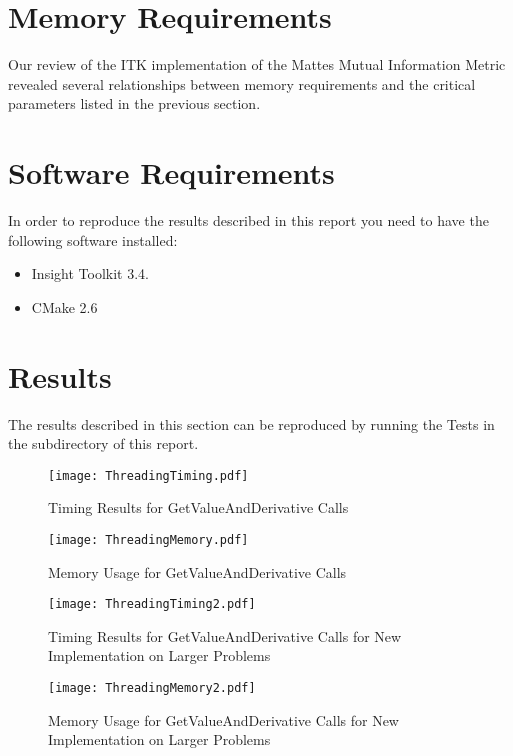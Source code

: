 \documentclass{InsightArticle}
\begin{document}
\section{Memory Requirements}
\label{sec:MemoryRequirements}

Our review of the ITK implementation of the Mattes Mutual Information Metric
revealed several relationships between memory requirements and the critical
parameters listed in the previous section.

\section{Software Requirements}

In order to reproduce the results described in this report you need to have the
following software installed:

\begin{itemize}
  \item  Insight Toolkit 3.4.
  \item  CMake 2.6
\end{itemize}


\appendix

\section{Results}

The results described in this section can be reproduced by running the Tests in
the  subdirectory of this report.

\begin{figure}[ht]
\centering
\texttt{[image: ThreadingTiming.pdf]}
\caption{Timing Results for GetValueAndDerivative Calls}
\label{fig:GetValueTiming}
\end{figure}

\begin{figure}[ht]
\centering
\texttt{[image: ThreadingMemory.pdf]}
\label{fig:GetValueMemory}
\caption{Memory Usage for GetValueAndDerivative Calls}
\end{figure}

\begin{figure}[ht]
\centering
\texttt{[image: ThreadingTiming2.pdf]}
\caption{Timing Results for GetValueAndDerivative Calls for New Implementation on Larger Problems}
\label{fig:GetValueTiming2}
\end{figure}

\begin{figure}[ht]
\centering
\texttt{[image: ThreadingMemory2.pdf]}
\label{fig:GetValueMemory2}
\caption{Memory Usage for GetValueAndDerivative Calls for New Implementation on Larger Problems}
\end{figure}



\end{document}

